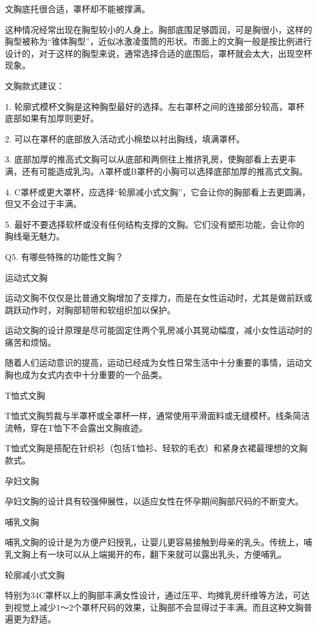 \documentclass[12pt,UTF8]{ctexbook}
\begin{document}
文胸底托很合适，罩杯却不能被撑满。

这种情况经常出现在胸型较小的人身上。胸部底围足够圆润，可是胸很小，这样的胸型被称为“锥体胸型”，近似冰激凌蛋筒的形状。市面上的文胸一般是按比例进行设计的，对于这样的胸型来说，通常选择合适的底围后，罩杯就会太大，出现空杯现象。


文胸款式建议：

1. 轮廓式模杯文胸是这种胸型最好的选择。左右罩杯之间的连接部分较高，罩杯底部如果有加厚则更好。

2. 可以在罩杯的底部放入活动式小棉垫以衬出胸线，填满罩杯。

3. 底部加厚的推高式文胸可以从底部和两侧往上推挤乳房，使胸部看上去更丰满，还有可能造成乳沟。A罩杯或B罩杯的小胸可以选择底部加厚的推高式文胸。

4. C罩杯或更大罩杯，应选择“轮廓减小式文胸”，它会让你的胸部看上去更圆满，但又不会过于丰满。

5. 最好不要选择软杯或没有任何结构支撑的文胸。它们没有塑形功能，会让你的胸线毫无魅力。





Q5. 有哪些特殊的功能性文胸？


运动式文胸

运动文胸不仅仅是比普通文胸增加了支撑力，而是在女性运动时，尤其是做前跃或跳跃动作时，对胸部韧带和软组织加以保护。

运动文胸的设计原理是尽可能固定住两个乳房减小其晃动幅度，减小女性运动时的痛苦和烦恼。

随着人们运动意识的提高，运动已经成为女性日常生活中十分重要的事情，运动文胸也成为女式内衣中十分重要的一个品类。

T恤式文胸

T恤式文胸剪裁与半罩杯或全罩杯一样，通常使用平滑面料或无缝模杯。线条简洁流畅，穿在T恤下不会露出文胸痕迹。

T恤式文胸是搭配在针织衫（包括T恤衫、轻软的毛衣）和紧身衣裙最理想的文胸款式。

孕妇文胸

孕妇文胸的设计具有较强伸展性，以适应女性在怀孕期间胸部尺码的不断变大。

哺乳文胸

哺乳文胸的设计是为方便产妇授乳，让婴儿更容易接触到母亲的乳头。传统上，哺乳文胸上有一块可以从上端揭开的布，翻下来就可以露出乳头，方便哺乳。

轮廓减小式文胸

特别为34C罩杯以上的胸部丰满女性设计，通过压平、均摊乳房纤维等方法，可达到视觉上减少1～2个罩杯尺码的效果，让胸部不会显得过于丰满。而且这种文胸普遍更为舒适。
\end{document}
